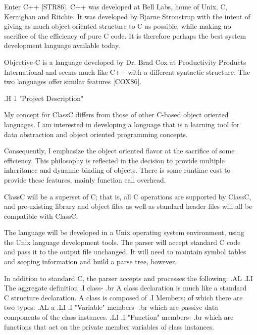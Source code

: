 Enter C++ [STR86].
C++ was developed at Bell Labs, home of Unix, C, Kernighan and
Ritchie.  It was developed by Bjarne Stroustrup with the intent of giving as
much object oriented structure to C as possible, while making no sacrifice of
the efficiency of pure C code.  It is therefore perhaps the best system
development language available today.

Objective-C is a language developed by Dr. Brad Cox at Productivity
Products International and seems much like
C++ with a different syntactic structure.
The two languages offer similar features [COX86].


.H 1 "Project Description"

My concept for ClassC differs from those of other C-based object oriented
languages.  I am interested in developing a language that is a
learning tool for data abstraction and object oriented programming
concepts.

Consequently, I emphasize the object oriented flavor at the sacrifice of
some efficiency.  This philosophy is reflected in the decision to provide
multiple inheritance and dynamic binding of objects.  There is some runtime
cost to provide these features, mainly function call overhead.

ClassC will be a superset of C; that is, all C operations are supported by
ClassC, and pre-existing library and object files as well as standard
header files will all be compatible with ClassC.

The language will be developed in a Unix operating system environment, using
the Unix language development tools.  The parser will accept standard C code
and pass it to the output file unchanged.  It will need to maintain symbol
tables and scoping information and build a parse tree, however.

In addition to standard C, the parser accepts and processes the following:
.AL
.LI
The aggregate definition
.I class-
.br
A class declaration is much like a standard C structure declaration.
A class is composed of
.I Members;
of which there are two types:
.AL a
.LI
.I "Variable"
 members-
.br
which are passive data components of the class instances.
.LI
.I "Function"
members-
.br
which are functions that act on the private member variables of class instances.

